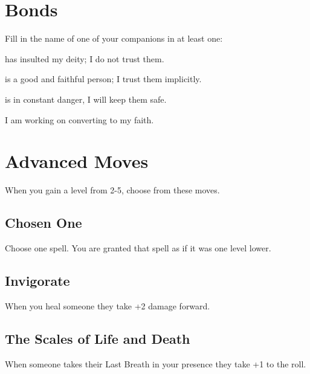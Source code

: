  
\section{Bonds}   
 



Fill in the name of one of your companions in at least one:

 

\thinrules[2] has insulted my deity; I do not trust them.

 

\thinrules[2] is a good and faithful person; I trust them implicitly.

 

\thinrules[2] is in constant danger, I will keep them safe.

 

I am working on converting \thinrules[2] to my faith.



 
\section{Advanced Moves}    
 


\startInstructionsAfterHeader
When you gain a level from 2-5, choose from these moves.
\stopInstructionsAfterHeader
 
\subsection{Chosen One}   
 

Choose one spell. You are granted that spell as if it was one level lower.

 
\subsection{Invigorate}   
 

When you heal someone they take +2 damage forward.

 
\subsection{The Scales of Life and Death}     
 

When someone takes their Last Breath in your presence they take +1 to the roll.


